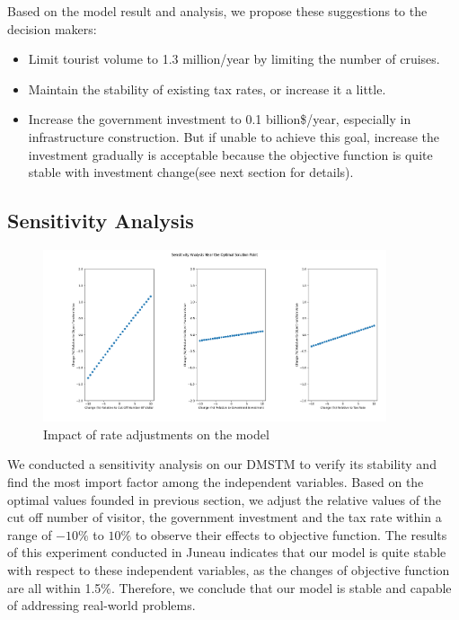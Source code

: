 \documentclass{mcmthesis}
\begin{document}
Based on the model result and analysis, we propose these suggestions to the decision makers:
\begin{itemize}
  \item Limit tourist volume to 1.3 million/year by limiting the number of cruises.
  \item Maintain the stability of existing tax rates, or increase it a little.
  \item Increase the government investment to 0.1 billion\$/year, especially in infrastructure construction.
  But if unable to achieve this goal, increase the investment gradually is acceptable because the objective function
  is quite stable with investment change(see next section for details).
\end{itemize}

\subsection{Sensitivity Analysis}
\begin{figure}[H]
  \centering
  \includegraphics[width=0.9\textwidth]{figures/sensitivity.png}
  \caption{Impact of rate adjustments on the model}
  \label{Fig.xxxxx}
\end{figure}

We conducted a sensitivity analysis on our DMSTM to verify its stability and find the most import factor among 
the independent variables. Based on the optimal values founded in previous section, we adjust the relative values of 
the cut off number of visitor, the government investment and the tax rate within a range of $-10\%$ to $10\%$
to observe their effects to objective function. The results of this experiment conducted in Juneau indicates that 
our model is quite stable with respect to these independent variables, as the changes of objective function are all 
within 1.5\%. Therefore, we conclude that our model is stable and capable of addressing real-world problems.
\end{document}
